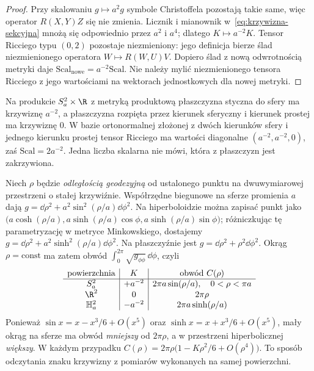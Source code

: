\begin{proof}
Przy skalowaniu $g\mapsto a^2g$ symbole
Christoffela pozostają takie same, więc operator
$R(X,Y)Z$ się nie zmienia. Licznik i mianownik
w~\eqref{eq:krzywizna-sekcyjna} mnożą się
odpowiednio przez $a^2$ i $a^4$; dlatego
$K\mapsto a^{-2}K$. Tensor Ricciego typu $(0,2)$
pozostaje niezmieniony: jego definicja bierze ślad
niezmienionego operatora $W\mapsto R(W,U)V$.
Dopiero ślad z nową odwrotnością metryki daje
$\mathrm{Scal}_{\mathrm{nowe}}=a^{-2}\mathrm{Scal}$.
Nie należy mylić niezmienionego tensora Ricciego
z jego wartościami na wektorach jednostkowych dla nowej metryki.
\end{proof}

\begin{przyklad}
Na produkcie $S_a^2\times\R$ z metryką produktową
płaszczyzna styczna do sfery ma krzywiznę $a^{-2}$,
a płaszczyzna rozpięta przez kierunek sferyczny
i kierunek prostej ma krzywiznę $0$. W bazie
ortonormalnej złożonej z dwóch kierunków sfery
i jednego kierunku prostej tensor Ricciego ma
wartości diagonalne $(a^{-2},a^{-2},0)$,
zaś $\mathrm{Scal}=2a^{-2}$. Jedna liczba skalarna
nie mówi, która z płaszczyzn jest zakrzywiona.
\end{przyklad}

\begin{przyklad}
\label{prz:obwod-kola-krzywizna}
Niech $\rho$ będzie \emph{odległością geodezyjną}
od ustalonego punktu na dwuwymiarowej przestrzeni
o stałej krzywiźnie. Współrzędne biegunowe na
sferze promienia $a$ dają
$g=\dd\rho^2+a^2\sin^2(\rho/a)\dd\phi^2$.
Na hiperboloidzie można zapisać punkt jako
$\bigl(a\cosh(\rho/a),
 a\sinh(\rho/a)\cos\phi,
 a\sinh(\rho/a)\sin\phi\bigr)$;
różniczkując tę parametryzację w metryce
Minkowskiego, dostajemy
$g=\dd\rho^2+a^2\sinh^2(\rho/a)\dd\phi^2$.
Na płaszczyźnie jest $g=\dd\rho^2+\rho^2\dd\phi^2$.
Okrąg $\rho=\mathrm{const}$ ma zatem obwód
$\int_0^{2\pi}\sqrt{g_{\phi\phi}}\,\dd\phi$, czyli
\begin{equation}\label{eq:obwod-kola-krzywizna}
 \begin{array}{c|c|c}
  \text{powierzchnia}& K & \text{obwód }C(\rho)\\ \hline
  S_a^2&+a^{-2}&2\pi a\sin(\rho/a),\quad 0<\rho<\pi a\\
  \R^2&0&2\pi\rho\\
  \mathbb H_a^2&-a^{-2}&2\pi a\sinh(\rho/a)
 \end{array}
\end{equation}
Ponieważ $\sin x=x-x^3/6+O(x^5)$ oraz
$\sinh x=x+x^3/6+O(x^5)$, mały okrąg na
sferze ma obwód \emph{mniejszy} od $2\pi\rho$,
a w przestrzeni hiperbolicznej \emph{większy}.
W każdym przypadku $C(\rho)=2\pi\rho
\bigl(1-K\rho^2/6+O(\rho^4)\bigr)$.
To sposób odczytania znaku krzywizny z pomiarów
wykonanych na samej powierzchni.
\end{przyklad}


